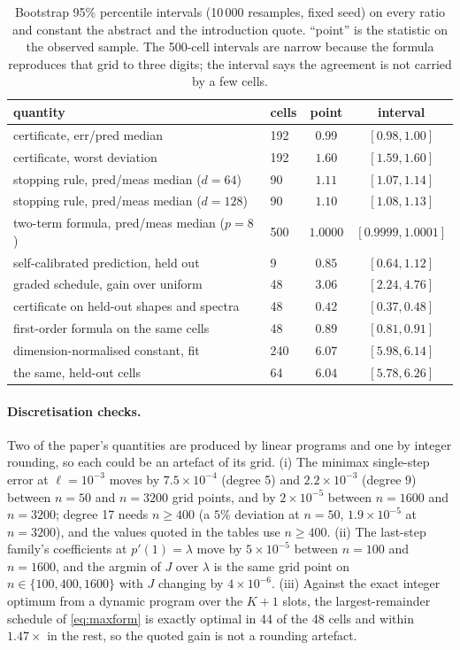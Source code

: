 \begin{table}[h]
\centering
\caption{Bootstrap 95\% percentile intervals (10\,000 resamples, fixed seed) on every
ratio and constant the abstract and the introduction quote.  ``point'' is the statistic on the
observed sample.  The 500-cell intervals are narrow because the formula reproduces that
grid to three digits; the interval says the agreement is not carried by a few cells.}
\label{tab:ci}
\begin{tabular}{llcc}
\toprule
quantity & cells & point & interval \\
\midrule
certificate, err/pred median & 192 & 0.99 & $[0.98,1.00]$ \\
certificate, worst deviation & 192 & $1.60$ & $[1.59,1.60]$ \\
stopping rule, pred/meas median ($d=64$) & 90 & $1.11$ & $[1.07,1.14]$ \\
stopping rule, pred/meas median ($d=128$) & 90 & $1.10$ & $[1.08,1.13]$ \\
two-term formula, pred/meas median ($p=8$) & 500 & $1.0000$ & $[0.9999,1.0001]$ \\
self-calibrated prediction, held out & 9 & $0.85$ & $[0.64,1.12]$ \\
graded schedule, gain over uniform & 48 & $3.06$ & $[2.24,4.76]$ \\
certificate on held-out shapes and spectra & 48 & $0.42$ & $[0.37,0.48]$ \\
first-order formula on the same cells & 48 & $0.89$ & $[0.81,0.91]$ \\
dimension-normalised constant, fit & 240 & $6.07$ & $[5.98,6.14]$ \\
the same, held-out cells & 64 & $6.04$ & $[5.78,6.26]$ \\
\bottomrule
\end{tabular}
\end{table}

\paragraph{Discretisation checks.}
Two of the paper's quantities are produced by linear programs and one by integer
rounding, so each could be an artefact of its grid.  (i) The minimax single-step error at
$\ell=10^{-3}$ moves by $7.5\times10^{-4}$ (degree 5) and $2.2\times10^{-3}$ (degree 9)
between $n=50$ and $n=3200$ grid points, and by $2\times10^{-5}$ between $n=1600$ and
$n=3200$; degree 17 needs $n\ge400$ (a $5\%$ deviation at $n=50$, $1.9\times10^{-5}$ at
$n=3200$), and the values quoted in the tables use $n\ge400$.  (ii) The last-step family's coefficients at $p'(1)=\lambda$ move by
$5\times10^{-5}$ between $n=100$ and $n=1600$, and the argmin of $J$ over $\lambda$ is the
same grid point on $n\in\{100,400,1600\}$ with $J$ changing by $4\times10^{-6}$.
(iii) Against the exact integer optimum from a dynamic program over the $K+1$ slots, the
largest-remainder schedule of \eqref{eq:maxform} is exactly optimal in 44 of the 48
cells and within $1.47\times$ in the rest, so the quoted gain is not a rounding artefact.

